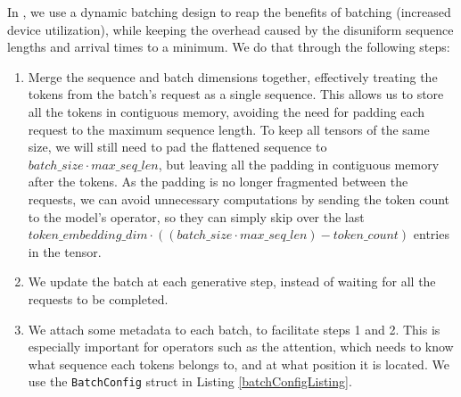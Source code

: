 In \Project, we use a dynamic batching design to reap the benefits of batching (increased device utilization), while keeping the overhead caused by the disuniform sequence lengths and arrival times to a minimum. We do that through the following steps:
\begin{enumerate}
    \item Merge the sequence and batch dimensions together, effectively treating the tokens from the batch's request as a single sequence. This allows us to store all the tokens in contiguous memory, avoiding the need for padding each request to the maximum sequence length. To keep all tensors of the same size, we will still need to pad the flattened sequence to $batch\_size \cdot max\_seq\_len$, but leaving all the padding in contiguous memory after the tokens. As the padding is no longer fragmented between the requests, we can avoid unnecessary computations by sending the token count to the model's operator, so they can simply skip over the last $token\_embedding\_dim \cdot ((batch\_size \cdot max\_seq\_len) - token\_count)$ entries in the tensor.
    \item We update the batch at each generative step, instead of waiting for all the requests to be completed. 
    \item We attach some metadata to each batch, to facilitate steps 1 and 2. This is especially important for operators such as the attention, which needs to know what sequence each tokens belongs to, and at what position it is located. We use the \texttt{BatchConfig} struct in Listing \ref{batchConfigListing}.
\end{enumerate}

